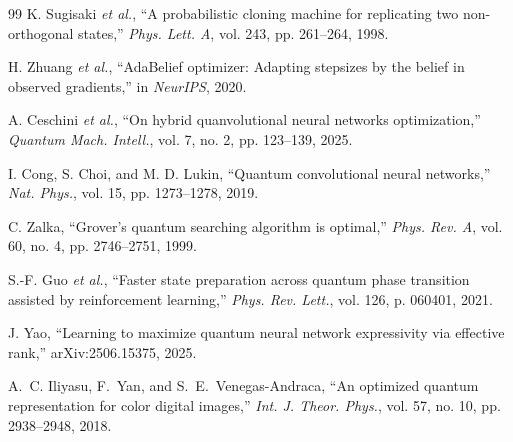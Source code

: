 \documentclass[onecolumn,12pt]{IEEEtran}
\begin{document}
\begin{thebibliography}{99}
K. Sugisaki \textit{et al.},
“A probabilistic cloning machine for replicating two non-orthogonal states,”
\textit{Phys. Lett. A}, vol. 243, pp. 261–264, 1998.

H. Zhuang \textit{et al.},
“AdaBelief optimizer: Adapting stepsizes by the belief in observed gradients,”
in \textit{NeurIPS}, 2020.

A. Ceschini \textit{et al.},
“On hybrid quanvolutional neural networks optimization,”
\textit{Quantum Mach. Intell.}, vol. 7, no. 2, pp. 123–139, 2025.

I. Cong, S. Choi, and M. D. Lukin,
“Quantum convolutional neural networks,”
\textit{Nat. Phys.}, vol. 15, pp. 1273–1278, 2019.

C. Zalka,
“Grover’s quantum searching algorithm is optimal,”
\textit{Phys. Rev. A}, vol. 60, no. 4, pp. 2746–2751, 1999.

S.-F. Guo \textit{et al.},
“Faster state preparation across quantum phase transition assisted by reinforcement learning,”
\textit{Phys. Rev. Lett.}, vol. 126, p. 060401, 2021.

J. Yao,
“Learning to maximize quantum neural network expressivity via effective rank,”
arXiv:2506.15375, 2025.

A.~C. Iliyasu, F.~Yan, and S.~E.~Venegas-Andraca,
“An optimized quantum representation for color digital images,”
\textit{Int. J. Theor. Phys.}, vol. 57, no. 10, pp. 2938–2948, 2018.

\end{thebibliography}
\end{document}
